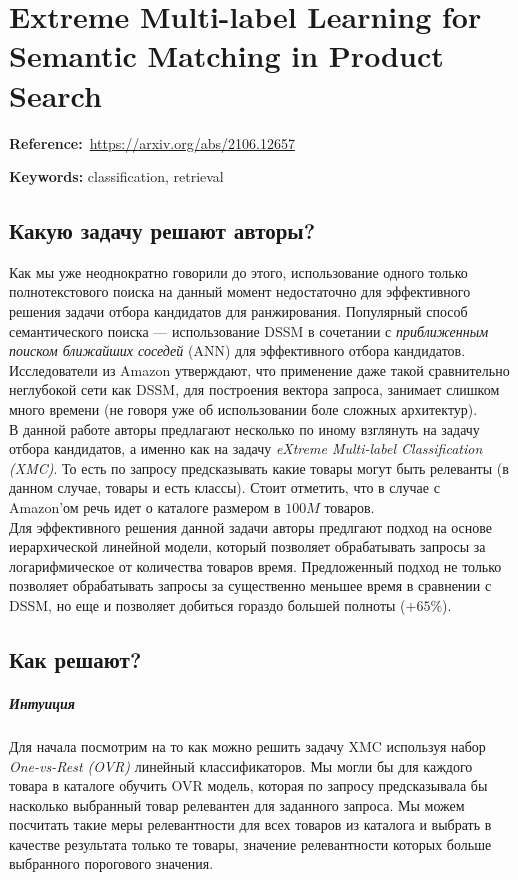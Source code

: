 \chapter{Extreme Multi-label Learning for Semantic Matching in Product Search}

\textbf{Reference:}~\url{https://arxiv.org/abs/2106.12657}

\textbf{Keywords:} classification, retrieval

\section*{Какую задачу решают авторы?}

Как мы уже неоднократно говорили до этого, использование одного только полнотекстового поиска на данный момент недостаточно для эффективного решения задачи отбора кандидатов для ранжирования.
Популярный способ семантического поиска --- использование DSSM в сочетании с \textit{приближенным поиском ближайших соседей} (ANN) для эффективного отбора кандидатов. \\

Исследователи из Amazon утверждают, что применение даже такой сравнительно неглубокой сети как DSSM, для построения вектора запроса, занимает слишком много времени (не говоря уже об использовании боле сложных архитектур). \\

В данной работе авторы предлагают несколько по иному взглянуть на задачу отбора кандидатов, а именно как на задачу \textit{eXtreme Multi-label Classification (XMC)}. 
То есть по запросу предсказывать какие товары могут быть релеванты (в данном случае, товары и есть классы).
Стоит отметить, что в случае с Amazon'ом речь идет о каталоге размером в $100M$ товаров.  \\

Для эффективного решения данной задачи авторы предлгают подход на основе иерархической линейной модели, который позволяет обрабатывать запросы за логарифмическое от количества товаров время.
Предложенный подход не только позволяет обрабатывать запросы за существенно меньшее время в сравнении с DSSM, но еще и позволяет добиться гораздо большей полноты ($+65\%$).

\section*{Как решают?}

\paragraph{Интуиция} Для начала посмотрим на то как можно решить задачу XMC используя набор \textit{One-vs-Rest (OVR)} линейный классификаторов.
Мы могли бы для каждого товара в каталоге обучить OVR модель, которая по запросу предсказывала бы насколько выбранный товар релевантен для заданного запроса.
Мы можем посчитать такие меры релевантности для всех товаров из каталога и выбрать в качестве результата только те товары, значение релевантности которых больше выбранного порогового значения. \\

